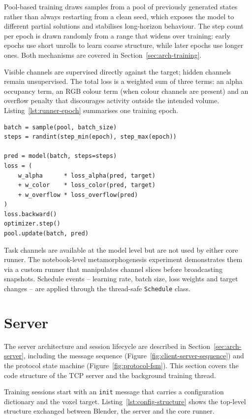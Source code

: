 Pool-based training draws samples from a pool of previously generated states
rather than always restarting from a clean seed, which exposes the model to
different partial solutions and stabilises long-horizon behaviour. The step
count per epoch is drawn randomly from a range that widens over training:
early epochs use short unrolls to learn coarse structure, while later epochs
use longer ones. Both mechanisms are covered in Section~\ref{sec:arch-training}.

Visible channels are supervised directly against the target; hidden channels
remain unsupervised. The total loss is a weighted sum of three terms: an alpha
occupancy term, an RGB colour term (when colour channels are present) and an
overflow penalty that discourages activity outside the intended volume.
Listing~\ref{lst:runner-epoch} summarises one training epoch.

\begin{lstlisting}[style=py, caption={One training epoch in the pool-based
runner (pseudocode).}, label={lst:runner-epoch}]
batch = sample(pool, batch_size)
steps = randint(step_min(epoch), step_max(epoch))

pred = model(batch, steps=steps)
loss = (
    w_alpha      * loss_alpha(pred, target)
    + w_color    * loss_color(pred, target)
    + w_overflow * loss_overflow(pred)
)
loss.backward()
optimizer.step()
pool.update(batch, pred)
\end{lstlisting}

Task channels are available at the model level but are not used by either core
runner. The notebook-level metamorphogenesis experiment demonstrates them via
a custom runner that manipulates channel slices before broadcasting snapshots.
Schedule events -- learning rate, batch size, loss weights and target
changes -- are applied through the thread-safe \texttt{Schedule} class.

\section{Server}
\label{sec:impl-server}

The server architecture and session lifecycle are described in
Section~\ref{sec:arch-server}, including the message sequence
(Figure~\ref{fig:client-server-sequence}) and the protocol state machine
(Figure~\ref{fig:protocol-fsm}). This section covers the code structure of
the TCP server and the background training thread.

Training sessions start with an \texttt{init} message that carries a
configuration dictionary and the voxel target.
Listing~\ref{lst:config-structure} shows the top-level structure exchanged
between Blender, the server and the core runner.


